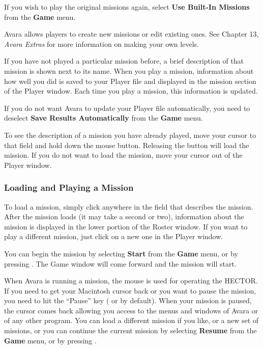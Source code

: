 \documentclass{article}
\begin{document}
If you wish to play the original missions again, select \textbf{Use Built-In Missions} from the \textbf{Game} menu.

Avara allows players to create new missions or edit existing ones. See Chapter 13, \textit{Avara Extras} for more information on making your own levels.

If you have not played a particular mission before, a brief description of that mission is shown next to its name. When you play a mission, information about how well you did is saved to your Player file and displayed in the mission section of the Player window. Each time you play a mission, this information is updated.

If you do not want Avara to update your Player file automatically, you need to deselect \textbf{Save Results Automatically} from the \textbf{Game} menu.

To see the description of a mission you have already played, move your cursor to that field and hold down the mouse button. Releasing the button will load the mission. If you do not want to load the mission, move your cursor out of the Player window.

\subsubsection{Loading and Playing a Mission}
To load a mission, simply click anywhere in the field that describes the mission. After the mission loads (it may take a second or two), information about the mission is displayed in the lower portion of the Roster window. If you want to play a different mission, just click on a new one in the Player window.

You can begin the mission by selecting \textbf{Start} from the \textbf{Game} menu, or by pressing \textbf{}. The Game window will come forward and the mission will start.

When Avara is running a mission, the mouse is used for operating the HECTOR. If you need to get your Macintosh cursor back or you want to pause the mission, you need to hit the ``Pause'' key (\textbf{} or \textbf{} by default). When your mission is paused, the cursor comes back allowing you access to the menus and windows of Avara or of any other program. You can load a different mission if you like, or a new set of missions, or you can continue the current mission by selecting \textbf{Resume} from the \textbf{Game} menu, or by pressing \textbf{}.
\end{document}
